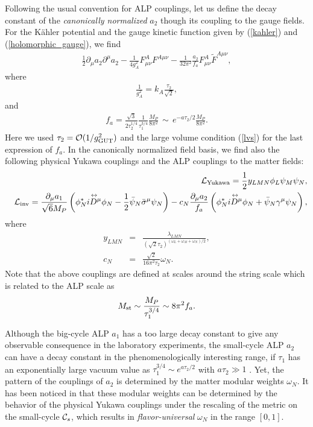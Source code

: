 \documentclass[preprint,prd,aps,tighten,nofootinbib,amssymb]{revtex4}
\newcommand{\bea}{\begin{eqnarray}}
\newcommand{\eea}{\end{eqnarray}}
\begin{document}
Following the usual convention for ALP couplings, let us define the decay constant of the {\it canonically normalized}  $a_2$ though its coupling to the gauge fields.
For  the K\"ahler potential and the gauge kinetic function  given by (\ref{kahler}) and (\ref{holomorphic_gauge}), we find
\bea
\frac{1}{2}\partial_\mu a_2\partial^\mu a_2 -\frac{1}{4g_{A}^2}F^A_{\mu\nu}F^{A \mu\nu} -
\frac{1}{32\pi^2} \frac{a_2}{f_a}  F^A_{\mu\nu}\widetilde F^{A \mu\nu},\eea
where 
\bea
 \frac{1}{g_{A}^2}= k_A\frac{\tau_2}{\sqrt{2}},
\eea
and 
\bea
f_a = \frac{\sqrt{3}}{2\tau_2^{1/4}}\frac{1}{\tau_1^{3/4}}\frac{M_P}{8\pi^2}\,\sim\, e^{-a\tau_2/2}\frac{M_P}{8\pi^2}. \eea
Here we used $\tau_2={\cal O}(1/g_{\rm GUT}^2)$ and the large volume condition (\ref{lvs}) for the last expression of $f_a$.
 In the canonically normalized field basis, we find  also the following physical Yukawa couplings and the ALP couplings to the matter fields:
\bea
&&{\cal L}_{\rm Yukawa}=\frac{1}{2}y_{LMN} \phi_L\psi_M\psi_N, \nonumber \\
&&{\cal L}_{\rm inv}= \frac{\partial_\mu a_1}{\sqrt{6}M_P}
 \left(\phi_N^* \overset{\leftrightarrow}{iD^\mu}\phi_N -\frac{1}{2} \bar\psi_N\bar\sigma^\mu \psi_N\right) 
 - c_N\frac{\partial_\mu a_2}{f_a} \left(\phi_N^* \overset{\leftrightarrow}{iD^\mu}\phi_N + \bar\psi_N\gamma^\mu \psi_N\right), 
\eea
where
\bea
 y_{LMN}&=&\frac{\lambda_{LMN}}{(\sqrt{2}\tau_2)^{(\omega_L+\omega_M+\omega_N)/2}}, \nonumber \\
c_{N}&=& \frac{\sqrt{2}}{16\pi^2\tau_2}\omega_N.\eea
Note that the above couplings are defined at scales around the string scale which is related to the ALP scale as \cite{Balasubramanian:2005zx}
\bea
M_{\rm st}\sim \frac{M_P}{\tau_1^{3/4}}\sim 8\pi^2 f_a.
\eea
 
 Although the big-cycle ALP $a_1$ has a  too large decay constant to give any observable consequence in the laboratory experiments, the small-cycle ALP $a_2$ can have a decay constant in the phenomenologically interesting range, if $\tau_1$ has an exponentially large vacuum value as
$\tau_1^{3/4}\sim e^{a\tau_2/2}$ with $a\tau_2\gg 1$ \cite{Antoniadis:1998ig,Burgess:1998px,Balasubramanian:2005zx}. Yet, the pattern of  the couplings of $a_2$
is determined by the matter modular weights $\omega_N$. It has been noticed  in \cite{Conlon:2006tj} that these modular weights  can be determined by the behavior of the physical Yukawa couplings  under the rescaling of the  metric on the small-cycle ${\cal C}_s$, which results in  {\it flavor-universal}  $\omega_N$ in the range $[0,1]$.
\end{document}
